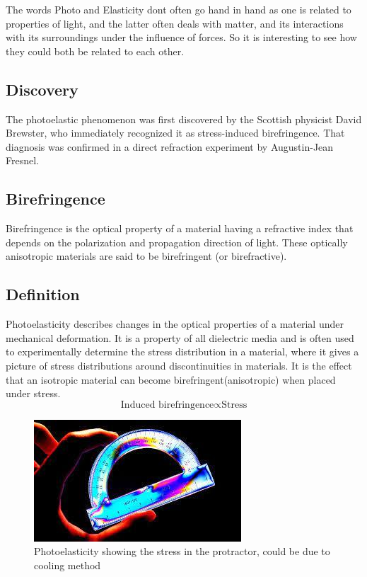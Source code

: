 \documentclass[11pt]{article}
\begin{document}
The words Photo and Elasticity dont often go hand in hand as one is related to properties of light, and the latter often deals with matter, and its interactions with its surroundings under the influence of forces. So it is interesting to see how they could both be related to each other. 

\subsection{Discovery}
The photoelastic phenomenon was first discovered by the Scottish physicist David Brewster, who immediately recognized it as stress-induced birefringence. That diagnosis was confirmed in a direct refraction experiment by Augustin-Jean Fresnel.

\subsection{Birefringence}
Birefringence is the optical property of a material having a refractive index that depends on the polarization and propagation direction of light. These optically anisotropic materials are said to be birefringent (or birefractive).

\subsection{Definition}
Photoelasticity describes changes in the optical properties of a material under mechanical deformation. It is a property of all dielectric media and is often used to experimentally determine the stress distribution in a material, where it gives a picture of stress distributions around discontinuities in materials. It is the effect that an isotropic material can become birefringent(anisotropic) when placed under stress. \\

\begin{equation}
\text{Induced birefringence} \propto \text{Stress}
\end{equation}


\begin{figure}[H]
	\centering
	\includegraphics[scale=.9]{photoelasticity protractor.jpg}
	\centering
	\caption{Photoelasticity showing the stress in the protractor, could be due to cooling method}
	\label{fig:This figure}
\end{figure}
\end{document}
